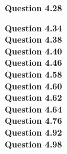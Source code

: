 \documentclass{article}
\begin{document}
    \textbf{Question 4.28}\\
    \textbf{Question 4.34}\\
    \textbf{Question 4.38}\\
    \textbf{Question 4.40}\\
    \textbf{Question 4.46}\\
    \textbf{Question 4.58}\\
    \textbf{Question 4.60}\\
    \textbf{Question 4.62}\\
    \textbf{Question 4.64}\\
    \textbf{Question 4.76}\\
    \textbf{Question 4.92}\\
    \textbf{Question 4.98}\\
\end{document}
